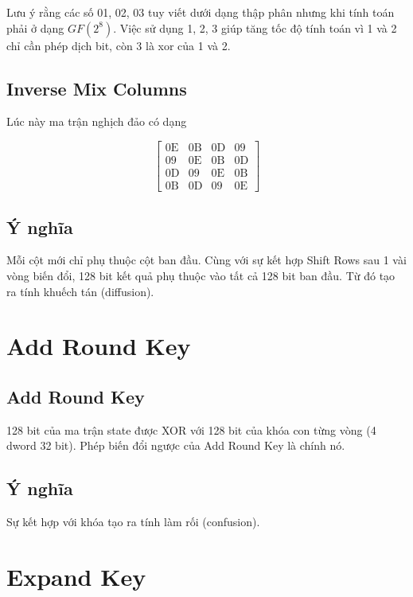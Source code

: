 \documentclass[a5paper]{article}
\begin{document}
    Lưu ý rằng các số 01, 02, 03 tuy viết dưới dạng thập phân nhưng khi tính toán phải ở dạng $GF(2^8)$. Việc sử dụng 1, 2, 3 giúp tăng tốc độ tính toán vì 1 và 2 chỉ cần phép dịch bit, còn 3 là xor của 1 và 2.

    \subsection{Inverse Mix Columns}

    Lúc này ma trận nghịch đảo có dạng

    \[\begin{bmatrix}
        \text{0E} & \text{0B} & \text{0D} & \text{09} \\
        \text{09} & \text{0E} & \text{0B} & \text{0D} \\
        \text{0D} & \text{09} & \text{0E} & \text{0B} \\
        \text{0B} & \text{0D} & \text{09} & \text{0E}
    \end{bmatrix}\]

    \subsection{Ý nghĩa}

    Mỗi cột mới chỉ phụ thuộc cột ban đầu. Cùng với sự kết hợp Shift Rows sau 1 vài vòng biến đổi, 128 bit kết quả phụ thuộc vào tất cả 128 bit ban đầu.
    Từ đó tạo ra tính khuếch tán (diffusion).

    \section{Add Round Key}

    \subsection{Add Round Key}

    128 bit của ma trận state được XOR với 128 bit của khóa con từng vòng (4 dword 32 bit). Phép biến đổi ngược của Add Round Key là chính nó.

    \subsection{Ý nghĩa}

    Sự kết hợp với khóa tạo ra tính làm rối (confusion).

    \section{Expand Key}
\end{document}
